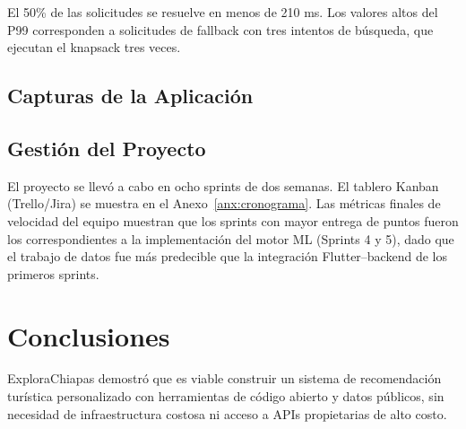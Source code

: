 \documentclass[12pt,letterpaper]{report}
\begin{document}
El 50\% de las solicitudes se resuelve en menos de 210 ms. Los valores altos del P99
corresponden a solicitudes de fallback con tres intentos de búsqueda, que ejecutan el
knapsack tres veces.

\section{Capturas de la Aplicación}



\section{Gestión del Proyecto}

El proyecto se llevó a cabo en ocho sprints de dos semanas. El tablero Kanban (Trello/Jira)
se muestra en el Anexo~\ref{anx:cronograma}. Las métricas finales de velocidad del equipo
muestran que los sprints con mayor entrega de puntos fueron los correspondientes a la
implementación del motor ML (Sprints 4 y 5), dado que el trabajo de datos fue más predecible
que la integración Flutter–backend de los primeros sprints.

\chapter{Conclusiones}

ExploraChiapas demostró que es viable construir un sistema de recomendación turística
personalizado con herramientas de código abierto y datos públicos, sin necesidad de
infraestructura costosa ni acceso a APIs propietarias de alto costo.
\end{document}
